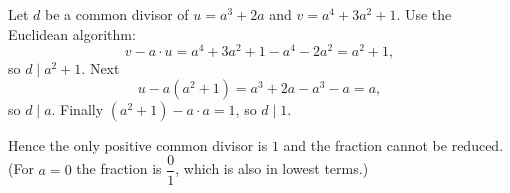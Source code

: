 Let $d$ be a common divisor of $u=a^3+2a$ and $v=a^4+3a^2+1$. Use the Euclidean algorithm:
\[
v-a\cdot u=a^4+3a^2+1-a^4-2a^2=a^2+1,
\]
so $d\mid a^2+1$. Next
\[
u-a\left(a^2+1\right)=a^3+2a-a^3-a=a,
\]
so $d\mid a$. Finally $\left(a^2+1\right)-a\cdot a=1$, so $d\mid1$.

Hence the only positive common divisor is $1$ and the fraction cannot be reduced. (For $a=0$ the fraction is $\dfrac{0}{1}$, which is also in lowest terms.)
